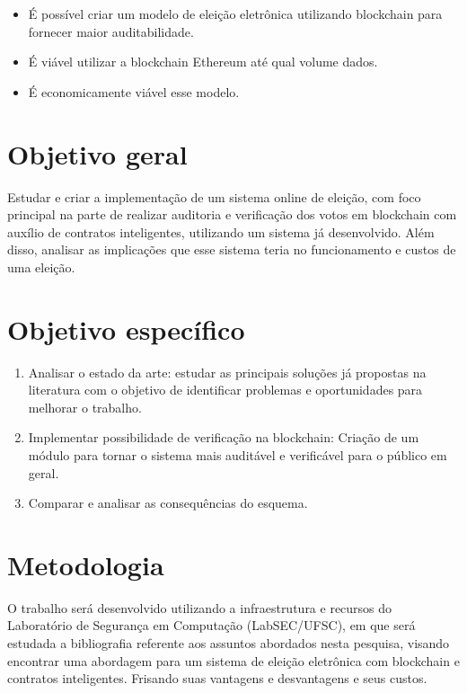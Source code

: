 \documentclass{ufsctex/ufsctex}
\begin{document}
\begin{itemize}
	\item É possível criar um modelo de eleição eletrônica utilizando blockchain
		para fornecer maior auditabilidade.
	\item É viável utilizar a blockchain Ethereum até qual volume dados.
	\item É economicamente viável esse modelo.
\end{itemize}

\section{Objetivo geral}

Estudar e criar a implementação de um sistema online de eleição, com foco
principal na parte de realizar auditoria e verificação dos votos em blockchain
com auxílio de contratos inteligentes, utilizando um sistema já desenvolvido.
Além disso, analisar as implicações que esse sistema teria no funcionamento e
custos de uma eleição. \\

\section{Objetivo específico}

\begin{enumerate}[label=\roman*.]
	\item Analisar o estado da arte: estudar as principais soluções
	já propostas na literatura com o objetivo de identificar problemas
	e oportunidades para melhorar o trabalho.
	\item Implementar possibilidade de verificação na blockchain:
	Criação de  um módulo para tornar o sistema mais auditável e 
	verificável para o público em geral.
	\item Comparar e analisar as consequências do esquema.
\end{enumerate}

\section{Metodologia}

O trabalho será desenvolvido utilizando a infraestrutura e recursos do
Laboratório de Segurança em Computação (LabSEC/UFSC), em que será estudada a
bibliografia referente aos assuntos abordados nesta pesquisa, visando encontrar
uma abordagem para um sistema de eleição eletrônica com blockchain e contratos
inteligentes.  Frisando suas vantagens e desvantagens e seus custos.
\end{document}

